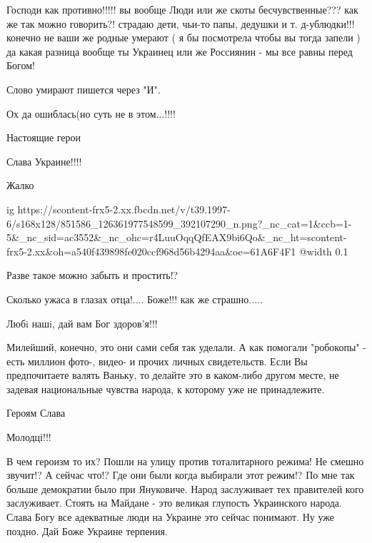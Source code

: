 
Господи как противно!!!!! вы вообще Люди или же скоты бесчувственные??? как же
так можно говорить?! страдаю дети, чьи-то папы, дедушки и т. д-ублюдки!!! конечно не
ваши же родные умерают ( я бы посмотрела чтобы вы тогда запели ) да какая разница
вообще ты Украинец или же Россиянин - мы все равны перед Богом!

\begin{itemize} %
Слово умирают пишется через "И".

Ох да ошиблась(но суть не в этом...!!!!
\end{itemize} %

Настоящие герои

Слава Украине!!!!

Жалко


\ifcmt
  ig https://scontent-frx5-2.xx.fbcdn.net/v/t39.1997-6/s168x128/851586_126361977548599_392107290_n.png?_nc_cat=1&ccb=1-5&_nc_sid=ac3552&_nc_ohc=r4LuuOqqQfEAX9bi6Qo&_nc_ht=scontent-frx5-2.xx&oh=a540f439898fe020ccf968d56b4294aa&oe=61A6F4F1
  @width 0.1
\fi

Разве такое можно забыть и простить!?

Сколько ужаса в глазах отца!.... Боже!!! как же страшно.....

Любi нашi, дай вам Бог здоров'я!!!


Милейший, конечно, это они сами себя так уделали. А как помогали "робокопы" -
есть миллион фото-, видео- и прочих личных свидетельств. Если Вы предпочитаете
валять Ваньку, то делайте это в каком-либо другом месте, не задевая
национальные чувства народа, к которому уже не принадлежите.

Героям Слава

Молодці!!!


В чем героизм то их? Пошли на улицу против тоталитарного режима! Не смешно
звучит!? А сейчас что!? Где они были когда выбирали этот режим!? По мне так
больше демократии было при Януковиче. Народ заслуживает тех правителей кого
заслуживает. Стоять на Майдане - это великая глупость Украинского народа. Слава
Богу все адекватные люди на Украине это сейчас понимают. Ну уже поздно. Дай
Боже Украине терпения.

